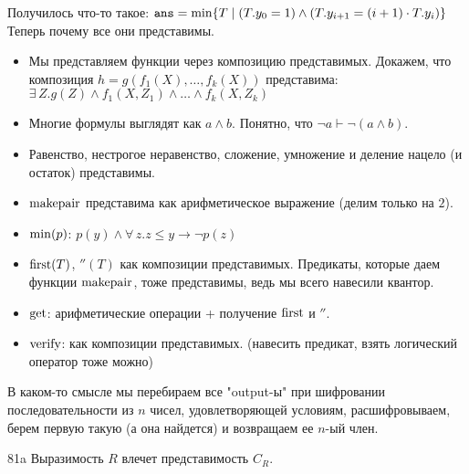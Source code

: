 \documentclass[12pt]{article}
\begin{document}
Получилось что-то такое: $\mathop{\texttt{ans}}=\min\{T\mid (T.y_0=1)\wedge(T.y_{i+1}=(i+1)\cdot T.y_i)\}$
\\
Теперь почему все они представимы.
\begin{itemize}
	\item Мы представляем функции через композицию представимых. Докажем, что композиция $h=g(f_1(X),\ldots,f_k(X))$ представима: $\exists\,Z.g(Z)\wedge f_1(X,Z_1)\wedge\ldots\wedge f_k(X, Z_k)$
	\item Многие формулы выглядят как $a\wedge b$. Понятно, что $\neg a\vdash\neg(a\wedge b)$.
	\item Равенство, нестрогое неравенство, сложение, умножение и деление нацело (и остаток) представимы.
	\item $\mathop{\mathrm{makepair}}$ представима как арифметическое выражение (делим только на $2$).
	\item $\mathop{\mathrm{min}}(p)$: $p(y)\wedge\forall\,z.z\leqslant y\to \neg p(z)$
	\item $\mathop{\mathrm{first}}(T)$, $\second(T)$ как композиции представимых. Предикаты, которые даем функции $\mathop{\mathrm{makepair}}$, тоже представимы, ведь мы всего навесили квантор.
	\item $\mathop{\mathrm{get}}$: арифметические операции + получение $\mathop{\mathrm{first}}$ и $\second$.
	\item $\mathop{\mathrm{verify}}$: как композиции представимых. (навесить предикат, взять логический оператор тоже можно)
\end{itemize}

В каком-то смысле мы перебираем все "output-ы" при шифровании последовательности из $n$ чисел, удовлетворяющей условиям, расшифровываем, берем первую такую (а она найдется) и возвращаем ее $n$-ый член.

\bigskip

81a Выразимость $R$ влечет представимость $C_R$.
\end{document}
